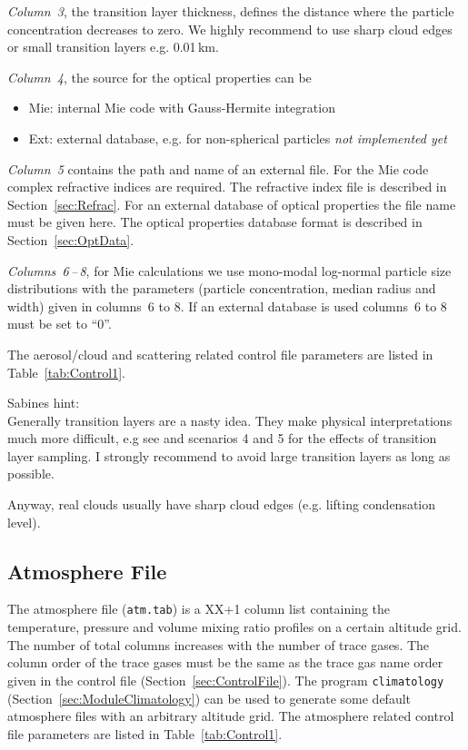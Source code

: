 \emph{Column~3}, the transition layer thickness, defines the distance where the particle concentration decreases to zero. We highly recommend to use sharp cloud edges or small transition layers e.g. 0.01\,km.

\emph{Column~4}, the source for the optical properties can be
\begin{itemize}
\item Mie: internal Mie code with Gauss-Hermite integration
\item Ext: external database, e.g. for non-spherical particles \emph{not implemented yet}
\end{itemize}

\emph{Column~5} contains the path and name of an external file. For the Mie code complex refractive indices are required. The refractive index file is described in Section~\ref{sec:Refrac}. For an external database of optical properties the file name must be given here. The optical properties database format is described in Section~\ref{sec:OptData}.

\emph{Columns~6\,--\,8}, for Mie calculations we use mono-modal log-normal particle size distributions with the parameters (particle concentration, median radius and width) given in columns~6 to 8. If an external database is used columns~6 to 8 must be set to ``0''. %

The aerosol/cloud and scattering related control file parameters are listed in Table~\ref{tab:Control1}.

Sabines hint:\\
Generally transition layers are a nasty idea. They make physical interpretations much more difficult, e.g see \citet{Griessbach2013} and \citet{Hoepfner2009} scenarios 4 and 5 for the effects of transition layer sampling. I strongly recommend to avoid large transition layers as long as possible.

Anyway, real clouds usually have sharp cloud edges (e.g. lifting condensation level).


\subsection{Atmosphere File}
\label{sec:AtmosphereFile}
The atmosphere file (\texttt{atm.tab}) is a XX+1 column list containing the temperature, pressure and volume mixing ratio profiles on a certain altitude grid. The number of total columns increases with the number of trace gases. The column order of the trace gases must be the same as the trace gas name order given in the control file (Section~\ref{sec:ControlFile}). The program \texttt{climatology} (Section~\ref{sec:ModuleClimatology}) can be used to generate some default atmosphere files with an arbitrary altitude grid. The atmosphere related control file parameters are listed in Table~\ref{tab:Control1}.

